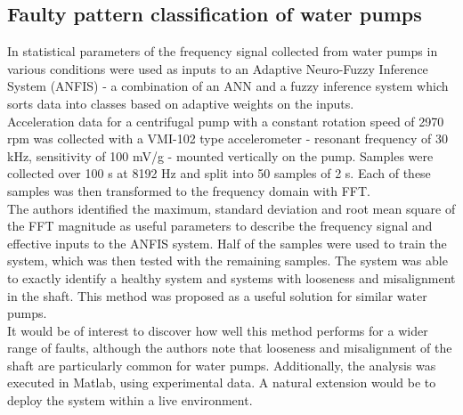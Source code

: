 \documentclass[conference]{IEEEtran}
\begin{document}
\subsection{Faulty pattern classification of water pumps}
In \cite{Moosavian} statistical parameters of the frequency signal collected from water pumps in various conditions were used as inputs to an Adaptive Neuro-Fuzzy Inference System (ANFIS) - a combination of an ANN and a fuzzy inference system which sorts data into classes based on adaptive weights on the inputs.\\
Acceleration data for a centrifugal pump with a constant rotation speed of 2970 rpm was collected with a VMI-102 type accelerometer - resonant frequency of 30 kHz, sensitivity of 100 mV/g - mounted vertically on the pump. Samples were collected over 100 s at 8192 Hz and split into 50 samples of 2 s. Each of these samples was then transformed to the frequency domain with FFT.\\
The authors identified the maximum, standard deviation and root mean square of the FFT magnitude as useful parameters to describe the frequency signal and effective inputs to the ANFIS system. Half of the samples were used to train the system, which was then tested with the remaining samples. The system was able to exactly identify a healthy system and systems with looseness and misalignment in the shaft. This method was proposed as a useful solution for similar water pumps.\\
It would be of interest to discover how well this method performs for a wider range of faults, although the authors note that looseness and misalignment of the shaft are particularly common for water pumps. Additionally, the analysis was executed in Matlab, using experimental data. A natural extension would be to deploy the system within a live environment.
\end{document}
